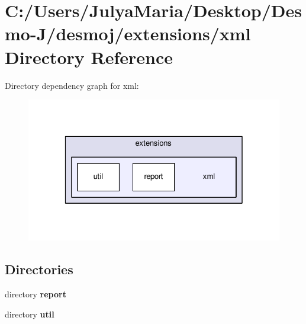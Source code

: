 \section{C\-:/\-Users/\-Julya\-Maria/\-Desktop/\-Desmo-\/\-J/desmoj/extensions/xml Directory Reference}
\label{dir_c8d53747d7afde8365a409e90cc83673}
Directory dependency graph for xml\-:
\nopagebreak
\begin{figure}[H]
\begin{center}
\leavevmode
\includegraphics[width=326pt]{dir_c8d53747d7afde8365a409e90cc83673_dep}
\end{center}
\end{figure}
\subsection*{Directories}
\begin{DoxyCompactItemize}
\item 
directory {\bf report}
\item 
directory {\bf util}
\end{DoxyCompactItemize}

